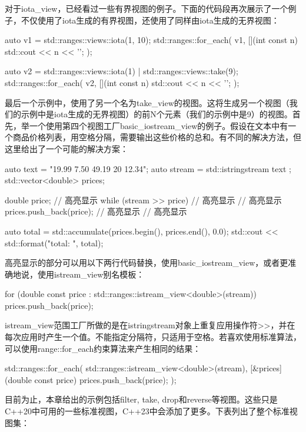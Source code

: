 对于iota\_view，已经看过一些有界视图的例子。下面的代码段再次展示了一个例子，不仅使用了iota生成的有界视图，还使用了同样由iota生成的无界视图：

\begin{cpp}
auto v1 = std::ranges::views::iota(1, 10);
std::ranges::for_each(
	v1,
	[](int const n) {std::cout << n << '\n'; });
	
auto v2 = std::ranges::views::iota(1) |
		  std::ranges::views::take(9);
std::ranges::for_each(
	v2,
	[](int const n) {std::cout << n << '\n'; });
\end{cpp}

最后一个示例中，使用了另一个名为take\_view的视图。这将生成另一个视图（我们的示例中是iota生成的无界视图）的前N个元素（我们的示例中是9）的视图。首先，举一个使用第四个视图工厂basic\_iostream\_view的例子。假设在文本中有一个商品价格列表，用空格分隔，需要输出这些价格的总和。有不同的解决方法，但这里给出了一个可能的解决方案：

\begin{cpp}
auto text = "19.99 7.50 49.19 20 12.34";
auto stream = std::istringstream{ text };
std::vector<double> prices;

double price; // 高亮显示
while (stream >> price) // 高亮显示
{ // 高亮显示
	prices.push_back(price); // 高亮显示
} // 高亮显示

auto total = std::accumulate(prices.begin(), prices.end(),
							 0.0);
std::cout << std::format("total: {}\n", total);
\end{cpp}

高亮显示的部分可以用以下两行代码替换，使用basic\_iostream\_view，或者更准确地说，使用istream\_view别名模板：

\begin{cpp}
for (double const price :
		std::ranges::istream_view<double>(stream))
{
	prices.push_back(price);
}
\end{cpp}

istream\_view范围工厂所做的是在istringstream对象上重复应用操作符>{}>，并在每次应用时产生一个值。不能指定分隔符，只适用于空格。若喜欢使用标准算法，可以使用range::for\_each约束算法来产生相同的结果：

\begin{cpp}
std::ranges::for_each(
	std::ranges::istream_view<double>(stream),
	[&prices](double const price) {
		prices.push_back(price); });
\end{cpp}

目前为止，本章给出的示例包括filter, take, drop和reverse等视图。这些只是C++20中可用的一些标准视图，C++23中会添加了更多。下表列出了整个标准视图集：

